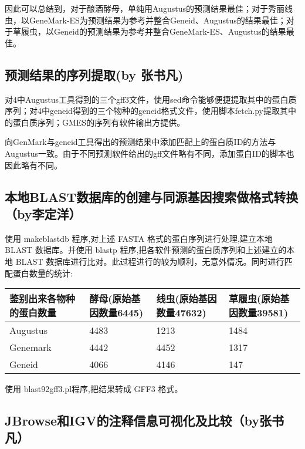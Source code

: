 \documentclass[12pt]{ctexart}
\begin{document}
因此可以总结到，对于酿酒酵母，单纯用Augustus的预测结果最佳；对于秀丽线虫，以GeneMark-ES为预测结果为参考并整合Geneid、Augustus的结果最佳；对于草履虫，以Geneid的预测结果为参考并整合GeneMark-ES、Augustus的结果最佳。



\subsection{预测结果的序列提取(by 张书凡)}

对4中Augustus工具得到的三个gff3文件，使用sed命令能够便捷提取其中的蛋白质序列；对4中geneid得到的三个物种的geneid格式文件，使用脚本fetch.py提取其中的蛋白质序列；GMES的序列有软件输出方提供。

向GenMark与geneid工具得出的预测结果中添加匹配上的蛋白质ID的方法与Augustus一致。由于不同预测软件给出的gff文件略有不同，添加蛋白ID的脚本也因此略有不同。

\subsection{本地BLAST数据库的创建与同源基因搜索做格式转换（by李定洋）}

使用 makeblastdb 程序,对上述 FASTA 格式的蛋白序列进行处理,建立本地 BLAST 数据库。并使用 blastp 程序,把各软件预测的蛋白质序列和上述建立的本地 BLAST 数据库进行比对。此过程进行的较为顺利，无意外情况。同时进行匹配蛋白数量的统计:

\begin{minipage}{\linewidth}
\centering
{} \label{tab:title} 
\begin{tabular}{ *4{C{1.15in}}}\toprule[1.5pt]
\textbf{鉴别出来各物种的蛋白数量} & \textbf{酵母(原始基因数量6445)} & \textbf{线虫(原始基因数量47632)} & \textbf{草履虫(原始基因数量39581)}\\ \hline
Augustus                         & 4483 & 1213 & 1484 \\
Genemark & 4442 & 4452 & 1317 \\
Geneid   & 4066 & 4146 & 147\\
\bottomrule[1.25pt]
\end {tabular}\par
\bigskip
\end{minipage}

使用 blast92gff3.pl程序,把结果转成 GFF3 格式。

\subsection{JBrowse和IGV的注释信息可视化及比较（by张书凡）}
\end{document}

